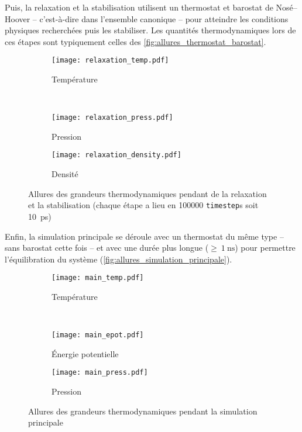 Puis, la relaxation et la stabilisation utilisent un thermostat et barostat de Nosé--Hoover -- c'est-à-dire dans l'ensemble canonique -- pour atteindre les conditions physiques recherchées puis les stabiliser. Les quantités thermodynamiques lors de ces étapes sont typiquement celles des \autoref{fig:allures_thermostat_barostat}.

\begin{figure}[htp]
    \centering
    \begin{subfigure}[t]{.49\textwidth}
        \texttt{[image: relaxation\_temp.pdf]}
        \caption{Température}
    \end{subfigure}%
    ~
    \begin{subfigure}[t]{.49\textwidth}
        \texttt{[image: relaxation\_press.pdf]}
        \caption{Pression}
    \end{subfigure}
    \begin{subfigure}[t]{.49\textwidth}
        \texttt{[image: relaxation\_density.pdf]}
        \caption{Densité}
    \end{subfigure}
    \caption{Allures des grandeurs thermodynamiques pendant de la relaxation et la stabilisation {\tiny (chaque étape a lieu en \num{100000} \lstinline!timestep!s soit \qty{10}{\pico \second})}}
    \label{fig:allures_thermostat_barostat}
\end{figure}

Enfin, la simulation principale se déroule avec un thermostat du même type -- sans barostat cette fois -- et avec une durée plus longue ($\geq~\qty{1}{\nano \second}$) pour permettre l'équilibration du système (\autoref{fig:allures_simulation_principale}).

\begin{figure}[hbp]
    \centering
    \begin{subfigure}[t]{.49\textwidth}
        \texttt{[image: main\_temp.pdf]}
        \caption{Température}
    \end{subfigure}%
    ~
    \begin{subfigure}[t]{.49\textwidth}
        \texttt{[image: main\_epot.pdf]}
        \caption{Énergie potentielle}
    \end{subfigure}
    \begin{subfigure}[t]{.49\textwidth}
        \texttt{[image: main\_press.pdf]}
        \caption{Pression}
    \end{subfigure}
    \caption{Allures des grandeurs thermodynamiques pendant la simulation principale}
    \label{fig:allures_simulation_principale}
\end{figure}
